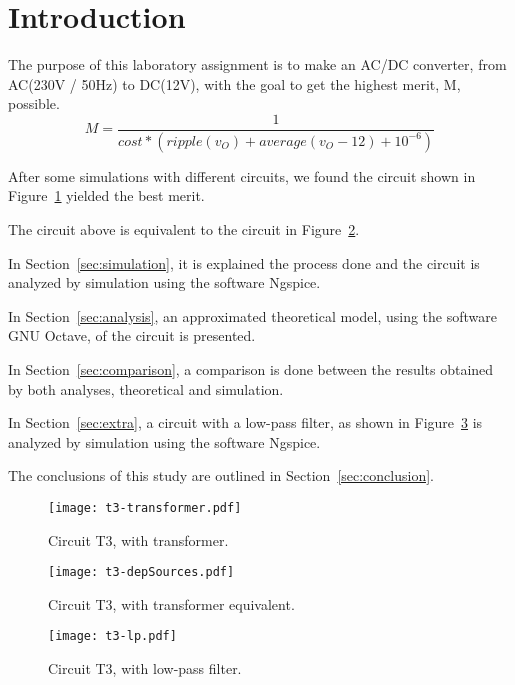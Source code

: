\section{Introduction}
\label{sec:introduction}

The purpose of this laboratory assignment is to make an AC/DC converter, from AC(230V / 50Hz) to DC(12V), with the goal to get the highest merit, M, possible.
$$ M = \frac{1}{cost*(ripple(v_O)+average(v_O-12)+10^{-6})}$$

After some simulations with different circuits, we found the circuit shown in Figure~\ref{fig:t3-transformer} yielded the best merit.

The circuit above is equivalent to the circuit in Figure~\ref{fig:t3-depSources}.

In Section~\ref{sec:simulation}, it is explained the process done and the circuit is analyzed by
simulation using the software Ngspice. 


In Section~\ref{sec:analysis}, an approximated theoretical model, using the software GNU Octave, of the circuit is presented. 

In Section~\ref{sec:comparison}, a comparison is done between the results obtained by both analyses, theoretical and simulation.

In Section~\ref{sec:extra},  a circuit with a low-pass filter, as shown in Figure~\ref{fig:t3-lp} is analyzed by
simulation using the software Ngspice. 

The conclusions of this study are outlined in
Section~\ref{sec:conclusion}.


\begin{figure}[ht!]
\centering
    \texttt{[image: t3-transformer.pdf]}
\caption{Circuit T3, with transformer.}
\label{fig:t3-transformer}
\end{figure}

\begin{figure}[ht!]
\centering
    \texttt{[image: t3-depSources.pdf]}
\caption{Circuit T3, with transformer equivalent.}
\label{fig:t3-depSources}
\end{figure}

\begin{figure}[ht!]
\centering
    \texttt{[image: t3-lp.pdf]}
\caption{Circuit T3, with low-pass filter.}
\label{fig:t3-lp}
\end{figure}

\FloatBarrier
